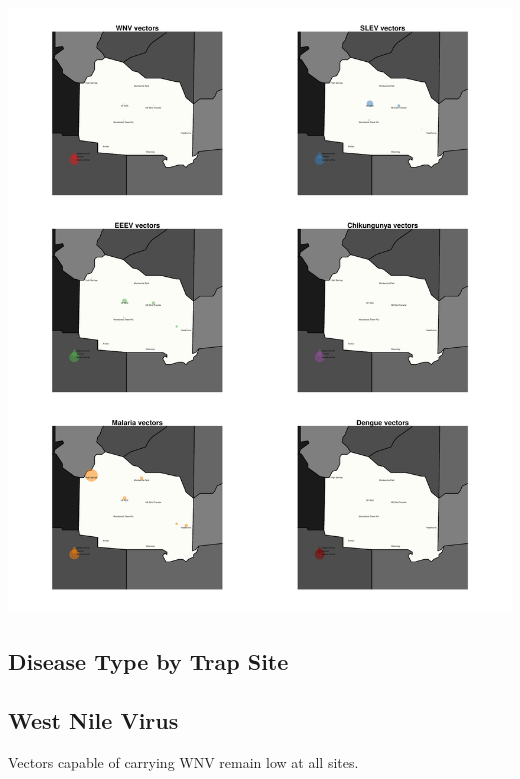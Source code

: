 \documentclass{article}
\begin{document}
\begin{center}
\includegraphics{mosq04nov13-007}
\end{center}
\newpage

\begin{center}
\section*{Disease Type by Trap Site}

\subsection*{West Nile Virus}

\end{center}

Vectors capable of carrying WNV remain low at all sites.\\
\end{document}

